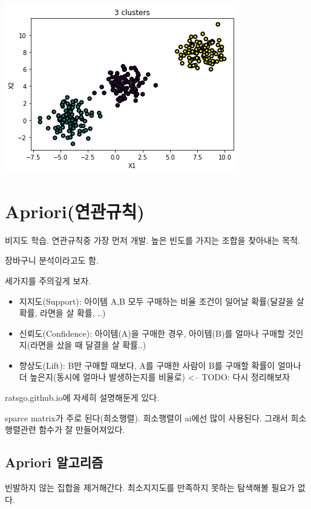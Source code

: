 \documentclass[11pt]{article}
\begin{document}
\begin{center}
\includegraphics[width=.9\linewidth]{./obipy-resources/s4T8IX.png}
\end{center}

\section{Apriori(연관규칙)}
\label{sec:orgefa1f0d}
비지도 학습. 연관규칙중 가장 먼저 개발. 높은 빈도를 가지는 조합을 찾아내는 목적. 

장바구니 분석이라고도 함.

세가지를 주의깊게 보자.
\begin{itemize}
\item 지지도(Support): 아이템 A,B 모두 구매하는 비율
조건이 일어날 확률(달걀을 살 확률, 라면을 살 확률, ..)
\item 신뢰도(Confidence): 아이템(A)을 구매한 경우, 아이템(B)를 얼마나 구매할 것인지(라면을 샀을 때 달결을 살 확률..)
\item 향상도(Lift): B만 구매할 때보다, A를 구매한 사람이 B를 구매할 확률이 얼마나 더 높은지(동시에 얼마나 발생하는지를 비율로) <-- TODO: 다시 정리해보자
\end{itemize}

ratsgo.github.io에 자세히 설명해둔게 있다.

sparce matrix가 주로 된다(희소행렬). 희소행렬이 ai에선 많이 사용된다. 그래서 희소행렬관련 함수가 잘 만들어져있다.


\subsection{Apriori 알고리즘}
\label{sec:org9def65d}
빈발하지 않는 집합을 제거해간다. 최소지지도를 만족하지 못하는 탐색해볼 필요가 없다.
\end{document}
